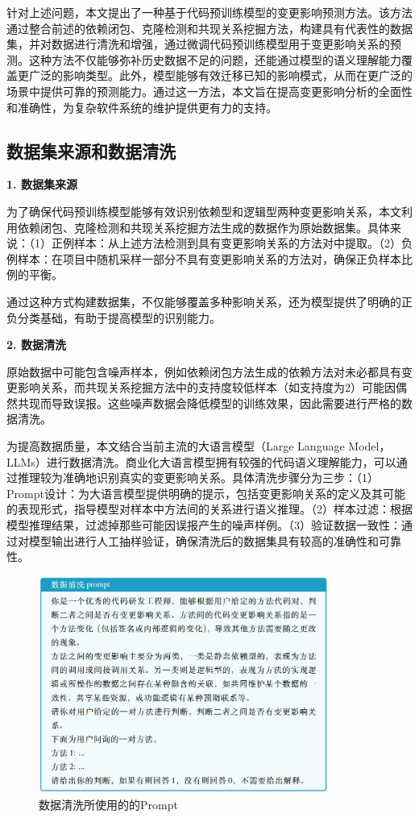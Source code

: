 针对上述问题，本文提出了一种基于代码预训练模型的变更影响预测方法。该方法通过整合前述的依赖闭包、克隆检测和共现关系挖掘方法，构建具有代表性的数据集，并对数据进行清洗和增强，通过微调代码预训练模型用于变更影响关系的预测。这种方法不仅能够弥补历史数据不足的问题，还能通过模型的语义理解能力覆盖更广泛的影响类型。此外，模型能够有效迁移已知的影响模式，从而在更广泛的场景中提供可靠的预测能力。通过这一方法，本文旨在提高变更影响分析的全面性和准确性，为复杂软件系统的维护提供更有力的支持。

\subsection{数据集来源和数据清洗}
\label{1_数据集来源和数据清洗}


\noindent \textbf{1. 数据集来源}

为了确保代码预训练模型能够有效识别依赖型和逻辑型两种变更影响关系，本文利用依赖闭包、克隆检测和共现关系挖掘方法生成的数据作为原始数据集。具体来说：（1）正例样本：从上述方法检测到具有变更影响关系的方法对中提取。（2）负例样本：在项目中随机采样一部分不具有变更影响关系的方法对，确保正负样本比例的平衡。

通过这种方式构建数据集，不仅能够覆盖多种影响关系，还为模型提供了明确的正负分类基础，有助于提高模型的识别能力。

\noindent \textbf{2. 数据清洗}

原始数据中可能包含噪声样本，例如依赖闭包方法生成的依赖方法对未必都具有变更影响关系，而共现关系挖掘方法中的支持度较低样本（如支持度为2）可能因偶然共现而导致误报。这些噪声数据会降低模型的训练效果，因此需要进行严格的数据清洗。

为提高数据质量，本文结合当前主流的大语言模型（Large Language Model，LLMs）进行数据清洗。商业化大语言模型拥有较强的代码语义理解能力，可以通过推理较为准确地识别真实的变更影响关系。具体清洗步骤分为三步：（1）Prompt设计：为大语言模型提供明确的提示，包括变更影响关系的定义及其可能的表现形式，指导模型对样本中方法间的关系进行语义推理。（2）样本过滤：根据模型推理结果，过滤掉那些可能因误报产生的噪声样例。（3）验证数据一致性：通过对模型输出进行人工抽样验证，确保清洗后的数据集具有较高的准确性和可靠性。

\begin{figure}[htbp]
\centering
\includegraphics[width = 0.85\textwidth]{figures/1_数据清洗.png}
\caption{数据清洗所使用的的Prompt}
\label{1_数据清洗}
\end{figure}

